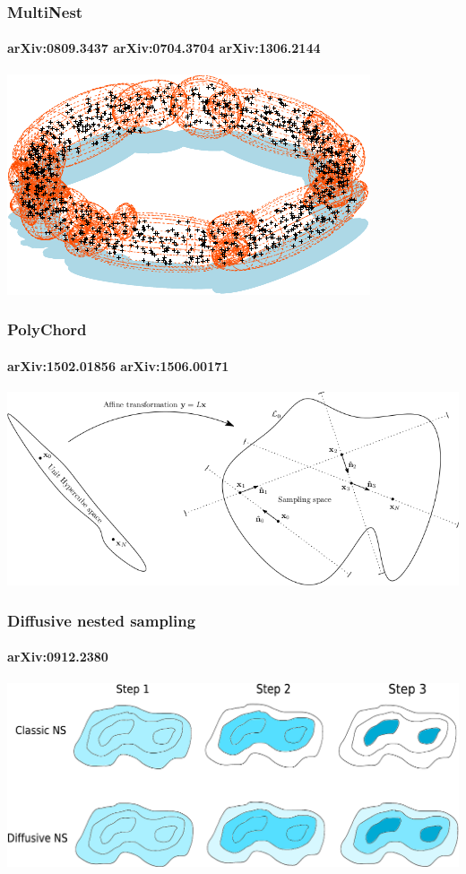\documentclass[%
]{beamer}
\begin{document}
\begin{frame}
\frametitle{MultiNest }
  \framesubtitle{arXiv:0809.3437 arXiv:0704.3704 arXiv:1306.2144}
  \includegraphics[width=\textwidth]{figures/multinest.pdf}
\end{frame}

\begin{frame}
  \frametitle{PolyChord}
  \framesubtitle{arXiv:1502.01856 arXiv:1506.00171}
  \includegraphics[width=\textwidth]{figures/polychord.png}
\end{frame}

\begin{frame}
  \frametitle{Diffusive nested sampling}
  \framesubtitle{arXiv:0912.2380}
  \includegraphics[width=\textwidth]{figures/dnest.pdf}
\end{frame}
\end{document}
